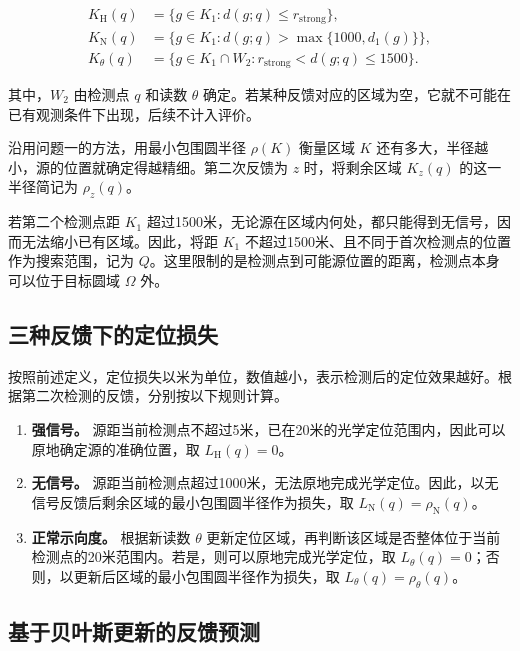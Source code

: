 \begin{equation}
\begin{aligned}
K_{\mathrm H}(q)&=\{g\in K_1:d(g;q)\le r_{\mathrm{strong}}\},\\
K_{\mathrm N}(q)&=\{g\in K_1:d(g;q)>\max\{1000,d_1(g)\}\},\\
K_\theta(q)&=\{g\in K_1\cap W_2:r_{\mathrm{strong}}<d(g;q)\le1500\}.
\end{aligned}
\label{eq:q2-pair-regions}
\end{equation}

其中，\(W_2\) 由检测点 \(q\) 和读数 \(\theta\) 确定。若某种反馈对应的区域为空，它就不可能在已有观测条件下出现，后续不计入评价。

沿用问题一的方法，用最小包围圆半径 \(\rho(K)\) 衡量区域 \(K\) 还有多大，半径越小，源的位置就确定得越精细。第二次反馈为 \(z\) 时，将剩余区域 \(K_z(q)\) 的这一半径简记为 \(\rho_z(q)\)。

若第二个检测点距 \(K_1\) 超过1500米，无论源在区域内何处，都只能得到无信号，因而无法缩小已有区域。因此，将距 \(K_1\) 不超过1500米、且不同于首次检测点的位置作为搜索范围，记为 \(Q\)。这里限制的是检测点到可能源位置的距离，检测点本身可以位于目标圆域 \(\Omega\) 外。

\subsection{三种反馈下的定位损失}

按照前述定义，定位损失以米为单位，数值越小，表示检测后的定位效果越好。根据第二次检测的反馈，分别按以下规则计算。

\begin{enumerate}[label=(\arabic*),leftmargin=2.2em]
  \item \textbf{强信号。} 源距当前检测点不超过5米，已在20米的光学定位范围内，因此可以原地确定源的准确位置，取 \(L_{\mathrm H}(q)=0\)。
  \item \textbf{无信号。} 源距当前检测点超过1000米，无法原地完成光学定位。因此，以无信号反馈后剩余区域的最小包围圆半径作为损失，取 \(L_{\mathrm N}(q)=\rho_{\mathrm N}(q)\)。
  \item \textbf{正常示向度。} 根据新读数 \(\theta\) 更新定位区域，再判断该区域是否整体位于当前检测点的20米范围内。若是，则可以原地完成光学定位，取 \(L_\theta(q)=0\)；否则，以更新后区域的最小包围圆半径作为损失，取 \(L_\theta(q)=\rho_\theta(q)\)。
\end{enumerate}

\subsection{基于贝叶斯更新的反馈预测}

